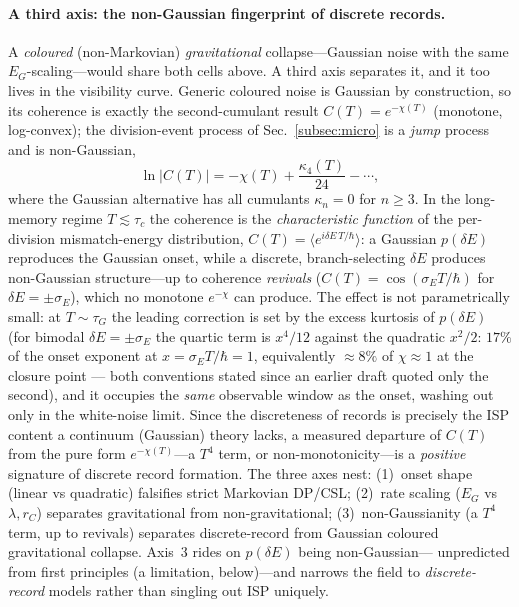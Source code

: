 \documentclass[aps,prd,onecolumn,amsmath,amssymb,nofootinbib,superscriptaddress]{revtex4-2}
\begin{document}
\paragraph{A third axis: the non-Gaussian fingerprint of discrete records.} A \emph{coloured}
(non-Markovian) \emph{gravitational} collapse---Gaussian noise with the same $E_G$-scaling---would
share both cells above. A third axis separates it, and it too lives in the visibility curve. Generic
coloured noise is Gaussian by construction, so its coherence is exactly the second-cumulant result
$C(T)=e^{-\chi(T)}$ (monotone, log-convex); the division-event process of Sec.~\ref{subsec:micro} is a
\emph{jump} process and is non-Gaussian,
\begin{equation}
\ln|C(T)|=-\chi(T)+\frac{\kappa_4(T)}{24}-\cdots,
\end{equation}
where the Gaussian alternative has all cumulants $\kappa_n=0$ for $n\ge3$. In the long-memory regime
$T\lesssim\tau_c$ the coherence is the \emph{characteristic function} of the per-division
mismatch-energy distribution, $C(T)=\langle e^{i\delta E\,T/\hbar}\rangle$: a Gaussian $p(\delta E)$
reproduces the Gaussian onset, while a discrete, branch-selecting $\delta E$ produces non-Gaussian
structure---up to coherence \emph{revivals} ($C(T)=\cos(\sigma_E T/\hbar)$ for $\delta E=\pm\sigma_E$),
which no monotone $e^{-\chi}$ can produce. The effect is not parametrically small: at $T\sim\tau_G$ the
leading correction is set by the excess kurtosis of $p(\delta E)$ (for bimodal $\delta E=\pm\sigma_E$
the quartic term is $x^4/12$ against the quadratic $x^2/2$: $17\%$ of the onset exponent at
$x = \sigma_E T/\hbar = 1$, equivalently $\approx8\%$ of $\chi\approx1$ at the closure point ---
both conventions stated since an earlier draft quoted only the second), and it occupies the \emph{same}
observable window as the onset, washing out only in the white-noise limit. Since the discreteness of
records is precisely the ISP content a continuum (Gaussian) theory lacks, a measured departure of
$C(T)$ from the pure form $e^{-\chi(T)}$---a $T^4$ term, or non-monotonicity---is a \emph{positive}
signature of discrete record formation. The three axes nest: (1)~onset shape (linear vs quadratic)
falsifies strict Markovian DP/CSL; (2)~rate scaling ($E_G$ vs $\lambda,r_C$) separates gravitational
from non-gravitational; (3)~non-Gaussianity (a $T^4$ term, up to revivals) separates discrete-record
from Gaussian coloured gravitational collapse. Axis~3 rides on $p(\delta E)$ being non-Gaussian---
unpredicted from first principles (a limitation, below)---and narrows the field to
\emph{discrete-record} models rather than singling out ISP uniquely.
\end{document}
